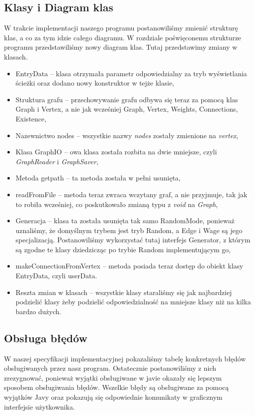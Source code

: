 \documentclass[10pt, a4paper]{report}
\begin{document}
\subsection{Klasy i Diagram klas}\label{subsec:klasy-i-diagram-klas}
W trakcie implementacji naszego programu postanowiliśmy zmienić strukturę klas,
a co za tym idzie całego diagramu. W rozdziale poświęconemu strukturze programu
przedstawiliśmy nowy diagram klas.
Tutaj przedstawimy zmiany w klasach.
\begin{itemize}
  \item EntryData -- klasa otrzymała parametr odpowiedzialny za tryb
        wyświetlania ścieżki oraz dodano nowy konstruktor w tejże klasie,
  \item Struktura grafu -- przechowywanie grafu odbywa się teraz za pomocą klas
        Graph i Vertex, a nie jak wcześniej Graph, Vertex, Weights, Connections,
        Existence,
  \item Nazewnictwo nodes -- wszystkie nazwy \textit{nodes} zostały zmienione
        na \textit{vertex},
  \item Klasa GraphIO -- owa klasa została rozbita na dwie mniejsze, czyli
        \textit{GraphReader} i \textit{GraphSaver},
  \item Metoda getpath -- ta metoda została w pełni usunięta,
  \item readFromFile -- metoda teraz zwraca wczytany graf, a nie przyjmuje, tak
        jak to robiła wcześniej, co poskutkowało zmianą typu z \textit{void} na
        \textit{Graph},
  \item Generacja -- klasa ta została usunięta tak samo RandomMode, ponieważ
        uznaliśmy, że domyślnym trybem jest tryb Random, a Edge i Wage są jego
        specjalizacją. Postanowiliśmy wykorzystać tutaj interfejs Generator, z którym
        są zgodne te klasy dziedzicząc po trybie Random implementującym go,
  \item makeConnectionFromVertex -- metoda posiada teraz dostęp do obiekt klasy
        EntryData, czyli userData.
  \item Reszta zmian w klasach -- wszystkie klasy staraliśmy się jak
        najbardziej podzielić klasy żeby podzielić odpowiedzialność na mniejsze klasy
        niż na kilka bardzo dużych.
\end{itemize}

\subsection{Obsługa błędów}\label{subsec:obsługa-błędów}
W naszej specyfikacji implementacyjnej pokazaliśmy tabelę konkretnych błędów
obsługiwanych przez nasz program. Ostatecznie postanowiliśmy z nich
zrezygnować, ponieważ wyjątki obsługiwane w javie okazały się lepszym
sposobem obsługiwania błędów. Wszelkie błędy są obsługiwane za pomocą wyjątków
Javy oraz pokazują się odpowiednie komunikaty w graficznym interfejsie
użytkownika.
\end{document}

